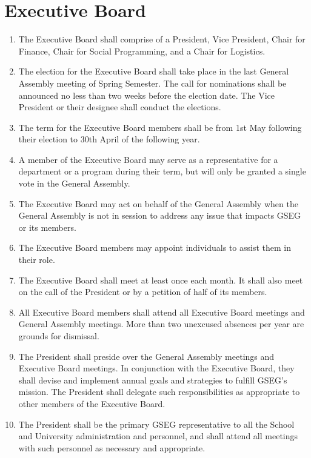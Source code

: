 \chapter{Executive Board}
\label{art:exec}

\begin{enumerate}[label=\Alph*.]

\item The Executive Board shall comprise of a President, Vice President, Chair for Finance, 
Chair for Social Programming, and a Chair for Logistics.
\item The election for the Executive Board shall take place in the last General Assembly meeting of Spring Semester. The call for nominations shall be announced no less than two weeks before the
election date. The Vice President or their designee shall conduct the elections.
\item The term for the Executive Board members shall be from 1st May following their election to
30th April of the following year.  
\item A member of the Executive Board may serve as a representative for a department or a
program during their term, but will only be granted a single vote in the General Assembly.
\item The Executive Board may act on behalf of the General Assembly when the General Assembly is
not in session to address any issue that impacts GSEG or its members.
\item The Executive Board members may appoint individuals to assist them in their role.

\item The Executive Board shall meet at least once each month. It shall also meet on the call
of the President or by a petition of half of its members. 

\item All Executive Board members shall attend all Executive Board meetings and General Assembly
meetings. More than two unexcused absences per year are grounds for dismissal.

\item The President shall preside over the General Assembly meetings and Executive Board meetings. In conjunction with the Executive Board, they shall devise and implement annual goals and strategies to fulfill GSEG's mission. The President shall delegate such responsibilities as appropriate to other members of the Executive Board. 

\item The President shall be the primary GSEG representative to all the School and University administration and personnel, and shall attend all meetings with such personnel as necessary and appropriate.


\end{enumerate}
